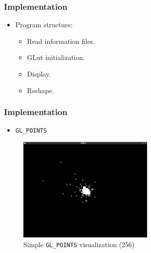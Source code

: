 \begin{frame}
    \frametitle{Implementation}
    \begin{itemize}
        \item Program structure:
        \begin{itemize}
            \item Read information files.
            \item GLut initialization.
            \item Display.
            \item Reshape.
        \end{itemize}
    \end{itemize}
\end{frame}

\begin{frame}
    \frametitle{Implementation}
    \begin{itemize}
        \item \texttt{GL\_POINTS}
    \end{itemize}
    \begin{figure}
        \begin{center}
           \includegraphics[width=0.6\textwidth]{img/bodies_sin_textura} 
        \end{center}
        \caption{Simple \texttt{GL\_POINTS} visualization (256)}
    \end{figure}
\end{frame}

